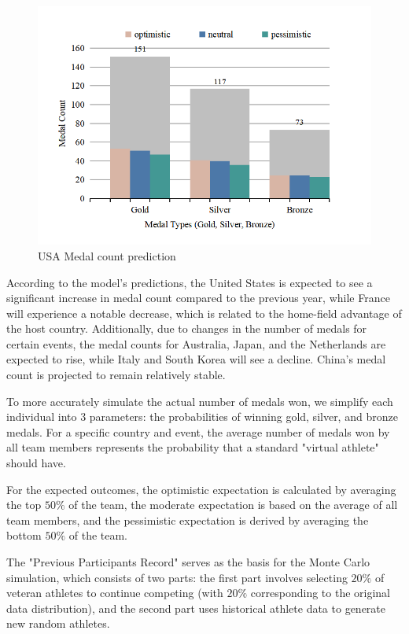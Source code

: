 \documentclass[12pt]{article}  %
\begin{document}
\begin{figure}[H]
	\centering
	\includegraphics[width=12cm]{img/OP1.png}
	\caption{USA Medal count prediction}
	\label{fig:USA}
\end{figure}


According to the model's predictions, the United States is expected to see a significant increase in medal count compared to the previous year, while France will experience a notable decrease, which is related to the home-field advantage of the host country. Additionally, due to changes in the number of medals for certain events, the medal counts for Australia, Japan, and the Netherlands are expected to rise, while Italy and South Korea will see a decline. China's medal count is projected to remain relatively stable.

To more accurately simulate the actual number of medals won, we simplify each individual into 3 parameters: the probabilities of winning gold, silver, and bronze medals. For a specific country and event, the average number of medals won by all team members represents the probability that a standard "virtual athlete" should have.

For the expected outcomes, the optimistic expectation is calculated by averaging the top \( 50\% \) of the team, the moderate expectation is based on the average of all team members, and the pessimistic expectation is derived by averaging the bottom \( 50\% \) of the team.

The "Previous Participants Record" serves as the basis for the Monte Carlo simulation, which consists of two parts: the first part involves selecting \( 20\% \) of veteran athletes to continue competing (with \( 20\% \) corresponding to the original data distribution), and the second part uses historical athlete data to generate new random athletes.
\end{document}
